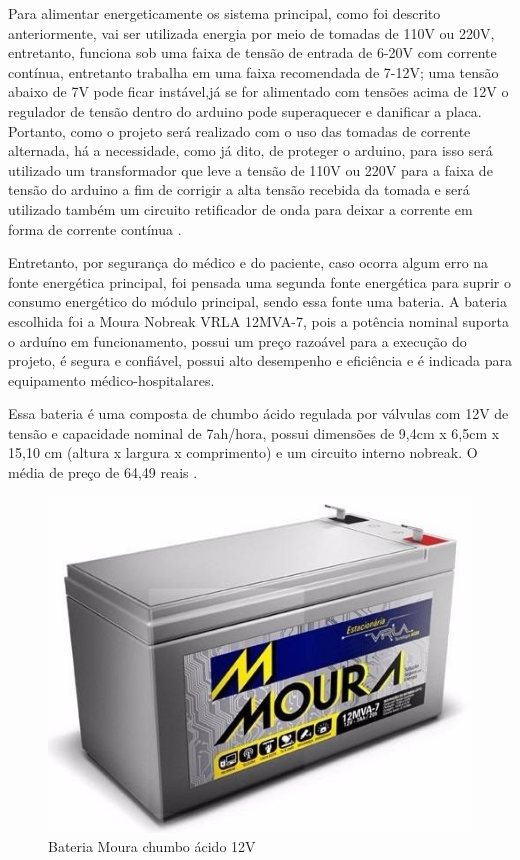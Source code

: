 Para alimentar energeticamente os sistema principal, como foi descrito anteriormente, vai ser utilizada energia por meio de tomadas de 110V ou 220V, entretanto, funciona sob uma faixa de tensão de entrada de 6-20V com corrente contínua, entretanto trabalha em uma faixa recomendada de 7-12V; uma tensão abaixo de 7V pode ficar instável,já se for alimentado com tensões acima de 12V o regulador de tensão dentro do arduino pode superaquecer e danificar a placa. Portanto, como o projeto será realizado com o uso das tomadas de corrente alternada, há a necessidade, como já dito, de proteger o arduino, para isso será utilizado um transformador que leve a tensão de 110V ou 220V para a faixa de tensão do arduino a fim de corrigir a alta tensão recebida da tomada e será utilizado também um circuito retificador de onda para deixar a corrente em forma de corrente contínua \cite{sadikualexander2013}.

Entretanto, por segurança do médico e do paciente, caso ocorra algum erro na fonte energética principal, foi pensada uma segunda fonte energética para suprir o consumo energético do módulo principal, sendo essa fonte uma bateria. A bateria escolhida foi a Moura Nobreak VRLA 12MVA-7, pois a potência nominal suporta o arduíno em funcionamento, possui um preço razoável para a execução do projeto, é segura e confiável, possui alto desempenho e eficiência e é indicada para equipamento médico-hospitalares.

Essa bateria é uma composta de chumbo ácido regulada por válvulas com 12V de tensão e capacidade nominal de 7ah/hora, possui dimensões de 9,4cm x 6,5cm x 15,10 cm (altura x largura x comprimento) e um circuito interno nobreak. O média de preço de 64,49 reais \cite{mlbateriamoura}.

\begin{figure}[H]
	\centering	\includegraphics[keepaspectratio=true,scale=0.4]{figuras/bateria_moura.jpg}
	\caption{Bateria Moura chumbo ácido 12V}
	\label{des_fig5}
\end{figure}

